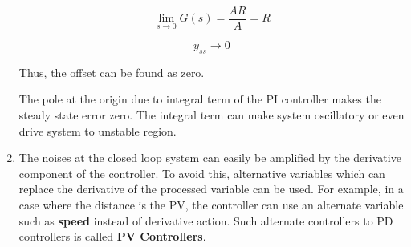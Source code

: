 \documentclass[a4paper,12pt]{article}
\begin{document}
\begin{enumerate}
			$$ \lim_{s \to 0} G(s)=\frac{AR}{A}=R $$
				
			$$ y_{ss} \to 0 $$
				
			Thus, the offset can be found as zero.
				
			The pole at the origin due to integral term of the PI controller makes the steady state error zero. The integral term can make system oscillatory or even drive system to unstable region.


		\item The noises at the closed loop system can easily be amplified by the derivative component of the controller. To avoid this, alternative variables which can replace the derivative of the processed variable can be used. For example, in a case where the distance is the PV, the controller can use an alternate variable such as \textbf{speed} instead of derivative action. Such alternate controllers to PD controllers is called \textbf{PV Controllers}.
	\end{enumerate}
		
					

		
		

	
% 
\end{document}
